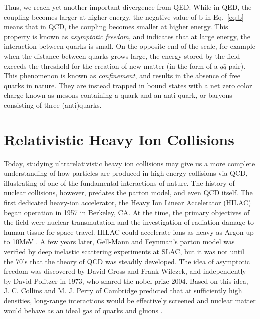   Thus, we reach yet another important divergence from QED: While in QED, the coupling becomes larger at higher energy, the negative value of b in Eq.~\ref{eq:b} means that in QCD, the coupling becomes smaller at higher energy. This property is known as \textit{asymptotic freedom}, and indicates that at large energy, the interaction between quarks is small. 
  On the opposite end of the scale, for example when the distance between quarks grows large, the energy stored by the field exceeds the threshold for the creation of new matter (in the form of a $q\bar{q}$ pair). This phenomenon is known as \textit{confinement}, and results in the absence of free quarks in nature. They are instead trapped in bound states with a net zero color charge known as mesons containing a quark and an anti-quark, or baryons consisting of three (anti)quarks.

\section{Relativistic Heavy Ion Collisions}\label{sec:rhics}
Today, studying ultrarelativistic heavy ion collisions may give us a more complete understanding of how particles are produced in high-energy collisions via QCD, illustrating of one of the fundamental interactions of nature. The history of nuclear collisions, however, predates the parton model, and even QCD itself. The first dedicated heavy-ion accelerator, the Heavy Ion Linear Accelerator (HILAC) began operation in 1957 in Berkeley, CA. At the time, the primary objectives of the field were nuclear transmutation and the investigation of radiation damage to human tissue for space travel. HILAC could accelerate ions as heavy as Argon up to 10MeV \cite{AIP2014}. A few years later, Gell-Mann and Feynman's parton model was verified by deep inelastic scattering experiments at SLAC, but it was not until the 70's that the theory of QCD was steadily developed. The idea of asymptotic freedom was discovered by David Gross and Frank Wilczek, and independently by David Politzer in 1973, who shared the nobel prize 2004. Based on this idea, J. C. Collins and M. J. Perry of Cambridge predicted that at sufficiently high densities, long-range interactions would be effectively screened and nuclear matter would behave as an ideal gas of quarks and gluons \cite{Collins1975}. %

